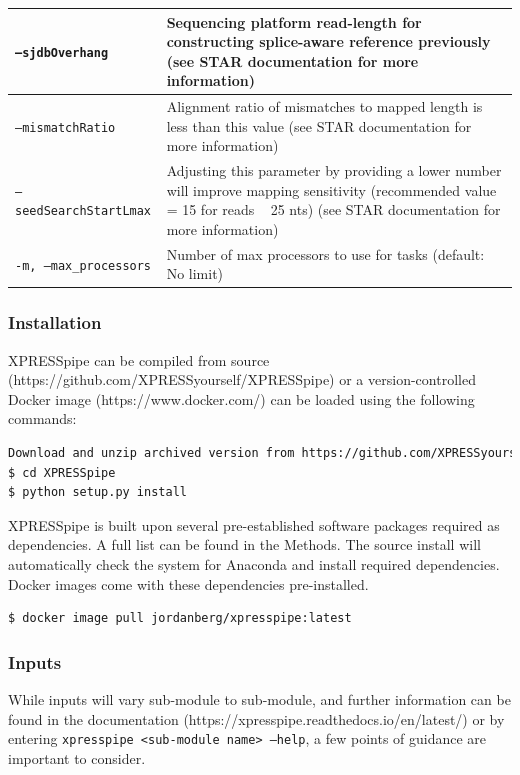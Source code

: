 \documentclass[11pt, a4paper, oneside]{article}
\begin{document}
\begin{tabular}{p{5cm}p{13cm}}
 \hline
 \texttt{--sjdbOverhang} & Sequencing platform read-length for constructing splice-aware reference previously (see STAR documentation for more information) \\
 \hline
 \texttt{--mismatchRatio} & Alignment ratio of mismatches to mapped length is less than this value (see STAR documentation for more information) \\
 \hline
 \texttt{--seedSearchStartLmax} & Adjusting this parameter by providing a lower number will improve mapping sensitivity (recommended value = 15 for reads ~ 25 nts) (see STAR documentation for more information) \\
 \hline
 \texttt{-m, --max\_processors} & Number of max processors to use for tasks (default: No limit) \\
\end{tabular}
\newline

\subsubsection{Installation}
XPRESSpipe can be compiled from source (https://github.com/XPRESSyourself/XPRESSpipe) or a version-controlled Docker image (https://www.docker.com/) can be loaded using the following commands:
\newline

\begin{lstlisting}[language=bash, caption=Source installation.]
Download and unzip archived version from https://github.com/XPRESSyourself/XPRESSpipe/releases
$ cd XPRESSpipe
$ python setup.py install
\end{lstlisting}

XPRESSpipe is built upon several pre-established software packages required as dependencies. A full list can be found in the Methods. The source install will automatically check the system for Anaconda\cite{anaconda} and install required dependencies. Docker images come with these dependencies pre-installed.

\begin{lstlisting}[language=bash, caption=Docker installation]
$ docker image pull jordanberg/xpresspipe:latest
\end{lstlisting}

\subsubsection{Inputs}
While inputs will vary sub-module to sub-module, and further information can be found in the documentation (https://xpresspipe.readthedocs.io/en/latest/) or by entering \texttt{xpresspipe \textless sub-module name\textgreater \ --help}, a few points of guidance are important to consider.
\end{document}
